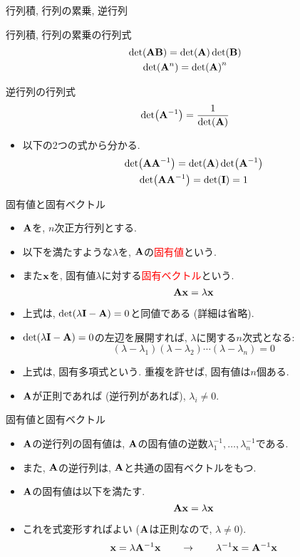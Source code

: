 \documentclass[dvipdfmx,notheorems,t]{beamer}
\begin{document}
\begin{frame}{行列積, 行列の累乗, 逆行列}
\begin{block}{行列積, 行列の累乗の行列式}
  \begin{gather*}
    \det(\vb{A} \vb{B}) = \det(\vb{A}) \det(\vb{B}) \\
    \det(\vb{A}^n) = \det(\vb{A})^n
  \end{gather*}
\end{block}

\begin{block}{逆行列の行列式}
  $$\det(\vb{A}^{-1}) = \frac{1}{\det(\vb{A})}$$
\end{block}

\begin{itemize}
  \item 以下の2つの式から分かる.
  \begin{gather*}
    \det(\vb{A} \vb{A}^{-1}) = \det(\vb{A}) \det(\vb{A}^{-1}) \\
    \det(\vb{A} \vb{A}^{-1}) = \det(\vb{I}) = 1
  \end{gather*}
\end{itemize}
\end{frame}

\begin{frame}{固有値と固有ベクトル}
\begin{itemize}
  \item $\vb{A}$を, $n$次正方行列とする.
  \item 以下を満たすような$\lambda$を, $\vb{A}$の\textcolor{red}{固有値}という.
  \item また$\vb{x}$を, 固有値$\lambda$に対する\textcolor{red}{固有ベクトル}という.
  $$\vb{A} \vb{x} = \lambda \vb{x}$$
  \item 上式は, $\det(\lambda \vb{I} - \vb{A}) = 0$と同値である (詳細は省略).
  \item $\det(\lambda \vb{I} - \vb{A}) = 0$の左辺を展開すれば, $\lambda$に関する$n$次式となる:
  $$(\lambda - \lambda_1) (\lambda - \lambda_2) \cdots (\lambda - \lambda_n) = 0$$
  \item 上式は, 固有多項式という. 重複を許せば, 固有値は$n$個ある.
  \item $\vb{A}$が正則であれば (逆行列があれば), $\lambda_i \neq 0$.
\end{itemize}
\end{frame}

\begin{frame}{固有値と固有ベクトル}
\begin{itemize}
  \item $\vb{A}$の逆行列の固有値は, $\vb{A}$の固有値の逆数$\lambda_1^{-1}, \ldots, \lambda_n^{-1}$である.
  \item また, $\vb{A}$の逆行列は, $\vb{A}$と共通の固有ベクトルをもつ.
  \item $\vb{A}$の固有値は以下を満たす.
  $$\vb{A} \vb{x} = \lambda \vb{x}$$
  \item これを式変形すればよい ($\vb{A}$は正則なので, $\lambda \neq 0$).
  $$\vb{x} = \lambda \vb{A}^{-1} \vb{x}
    \qquad \to \qquad \lambda^{-1} \vb{x} = \vb{A}^{-1} \vb{x}$$
\end{itemize}
\end{frame}
\end{document}
